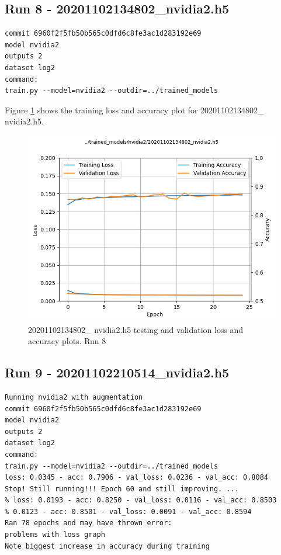 \subsection{Run 8 - 20201102134802\_nvidia2.h5}
\begin{verbatim}
commit 6960f2f5fb50b565c0dfd6c8fe3ac1d283192e69
model nvidia2
outputs 2
dataset log2
command:
train.py --model=nvidia2 --outdir=../trained_models
\end{verbatim}

Figure \ref{fig:20201102134802_nvidia2_accuracy} 
shows the training loss and accuracy plot for 20201102134802\_ nvidia2.h5.

\begin{figure}[h!]
\centering
\includegraphics[width=\textwidth]{Figures/20201102134802_nvidia2_accuracy.png}
\caption{20201102134802\_ nvidia2.h5 testing and validation loss and accuracy plots. Run 8}
\label{fig:20201102134802_nvidia2_accuracy}
\end{figure}

\subsection{Run 9 - 20201102210514\_nvidia2.h5}
\begin{verbatim}
Running nvidia2 with augmentation
commit 6960f2f5fb50b565c0dfd6c8fe3ac1d283192e69
model nvidia2
outputs 2
dataset log2
command:
train.py --model=nvidia2 --outdir=../trained_models
loss: 0.0345 - acc: 0.7906 - val_loss: 0.0236 - val_acc: 0.8084
Stop! Still running!!! Epoch 60 and still improving. ...
% loss: 0.0193 - acc: 0.8250 - val_loss: 0.0116 - val_acc: 0.8503
% 0.0123 - acc: 0.8501 - val_loss: 0.0091 - val_acc: 0.8594
Ran 78 epochs and may have thrown error:
problems with loss graph
Note biggest increase in accuracy during training
\end{verbatim}

